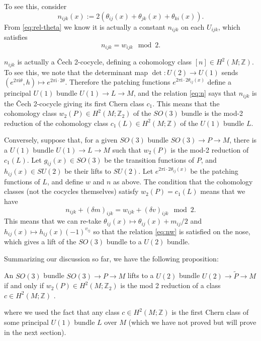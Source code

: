 \documentclass[12pt]{article}
\numberwithin{equation}{section}
\theoremstyle{remark}
\def\bZ{\mathbb{Z}}
\def\I{\mathrm{i}}
\begin{document}
To see this, consider \begin{equation}
  n_{ijk}(x):=2(\theta_{ij}(x)+\theta_{jk}(x)+\theta_{ki}(x)).\label{eq:n}
\end{equation}
From \eqref{eq:rel-theta} we know it is actually a constant $n_{ijk}$ on each $U_{ijk}$,
which satisfies \begin{equation}
  n_{ijk} = w_{ijk} \mod 2.\label{eq:nw}
\end{equation}


$n_{ijk}$ is actually a \v Cech 2-cocycle, defining a cohomology class $[n]\in H^2(M;\bZ)$.
To see this, we note that the determinant map $\det:U(2)\to U(1)$ 
sends $(e^{2\pi\I\theta},h)\mapsto e^{2\pi\I\cdot 2\theta}$.
Therefore the patching functions $e^{2\pi\I\cdot 2\theta_{ij}(x)}$ define a principal $U(1)$ bundle $U(1)\to L\to M$,
and the relation \eqref{eq:n} says that $n_{ijk}$ is the \v Cech 2-cocycle 
giving its first Chern class $c_1$.
This means that the cohomology class $w_2(P)\in H^2(M;\bZ_2)$ of the $SO(3)$ bundle 
is the mod-2 reduction of the cohomology class $c_1(L)\in H^2(M;\bZ)$ of the $U(1)$ bundle $L$.

Conversely, suppose that, for a given $SO(3)$ bundle $SO(3)\to P\to M$,
there is a $U(1)$ bundle $U(1)\to L\to M$ 
such that $w_2(P)$ is the mod-2 reduction of $c_1(L)$.
Let $g_{ij}(x)\in SO(3)$ be the transition functions of $P$,
and $h_{ij}(x)\in SU(2)$ be their lifts to $SU(2)$.
Let $e^{2\pi \I \cdot 2\theta_{ij}(x)}$ be the patching functions of $L$,
and define $w$ and $n$ as above.
The condition that the cohomology classes (not the cocycles themselves)
satisfy $w_2(P)=c_1(L)$
 means that we have \begin{equation}
  n_{ijk} +(\delta m)_{ijk}= w_{ijk} +(\delta v)_{ijk} \mod 2.
\end{equation}
This means that we can re-take $\theta_{ij}(x)\mapsto \theta_{ij}(x)+ m_{ij}/2 $ and $h_{ij}(x)\mapsto h_{ij}(x) (-1)^{v_{ij}}$
so that the relation \eqref{eq:nw} is satisfied on the nose,
which gives a lift of the $SO(3)$ bundle to a $U(2)$ bundle.



Summarizing our discussion so far, we have the following proposition:
\begin{proposition}
  An $SO(3)$ bundle $SO(3)\to P\to M$
  lifts to a $U(2)$ bundle $U(2)\to \tilde P\to M$ if and only if
   $w_2(P)\in H^2(M;\bZ_2)$ is 
  the mod 2 reduction of a class $c\in H^2(M;\bZ)$ .
\end{proposition}
where we used the fact that any class $c\in H^2(M;\bZ)$ is
the first Chern class of some principal $U(1)$ bundle $L$ over $M$ 
(which we have not proved but will prove in the next section).
\end{document}
